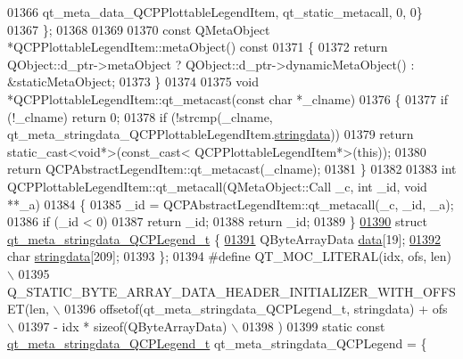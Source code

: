 \begin{DoxyCode}
01366       qt\_meta\_data\_QCPPlottableLegendItem,  qt\_static\_metacall, 0, 0\}
01367 \};
01368 
01369 
01370 \textcolor{keyword}{const} QMetaObject *QCPPlottableLegendItem::metaObject()\textcolor{keyword}{ const}
01371 \textcolor{keyword}{}\{
01372     \textcolor{keywordflow}{return} QObject::d\_ptr->metaObject ? QObject::d\_ptr->dynamicMetaObject() : &staticMetaObject;
01373 \}
01374 
01375 \textcolor{keywordtype}{void} *QCPPlottableLegendItem::qt\_metacast(\textcolor{keyword}{const} \textcolor{keywordtype}{char} *\_clname)
01376 \{
01377     \textcolor{keywordflow}{if} (!\_clname) \textcolor{keywordflow}{return} 0;
01378     \textcolor{keywordflow}{if} (!strcmp(\_clname, qt\_meta\_stringdata\_QCPPlottableLegendItem.\hyperlink{a00016_a25e998eb002b6a9f9e969afa5247748f}{stringdata}))
01379         \textcolor{keywordflow}{return} \textcolor{keyword}{static\_cast<}\textcolor{keywordtype}{void}*\textcolor{keyword}{>}(\textcolor{keyword}{const\_cast<} QCPPlottableLegendItem*\textcolor{keyword}{>}(\textcolor{keyword}{this}));
01380     \textcolor{keywordflow}{return} QCPAbstractLegendItem::qt\_metacast(\_clname);
01381 \}
01382 
01383 \textcolor{keywordtype}{int} QCPPlottableLegendItem::qt\_metacall(QMetaObject::Call \_c, \textcolor{keywordtype}{int} \_id, \textcolor{keywordtype}{void} **\_a)
01384 \{
01385     \_id = QCPAbstractLegendItem::qt\_metacall(\_c, \_id, \_a);
01386     \textcolor{keywordflow}{if} (\_id < 0)
01387         \textcolor{keywordflow}{return} \_id;
01388     \textcolor{keywordflow}{return} \_id;
01389 \}
\hypertarget{a00016_source_l01390}{}\hyperlink{a00016}{01390} \textcolor{keyword}{struct }\hyperlink{a00016_d2/da3/a00115}{qt\_meta\_stringdata\_QCPLegend\_t} \{
\hypertarget{a00016_source_l01391}{}\hyperlink{a00016_abb2a7af4ffa957bddb891b5663c0aa55}{01391}     QByteArrayData \hyperlink{a00016_abb2a7af4ffa957bddb891b5663c0aa55}{data}[19];
\hypertarget{a00016_source_l01392}{}\hyperlink{a00016_a26b79395b8d9f94641f81b197841ede1}{01392}     \textcolor{keywordtype}{char} \hyperlink{a00016_a26b79395b8d9f94641f81b197841ede1}{stringdata}[209];
01393 \};
01394 \textcolor{preprocessor}{#define QT\_MOC\_LITERAL(idx, ofs, len) \(\backslash\)}
01395 \textcolor{preprocessor}{    Q\_STATIC\_BYTE\_ARRAY\_DATA\_HEADER\_INITIALIZER\_WITH\_OFFSET(len, \(\backslash\)}
01396 \textcolor{preprocessor}{    offsetof(qt\_meta\_stringdata\_QCPLegend\_t, stringdata) + ofs \(\backslash\)}
01397 \textcolor{preprocessor}{        - idx * sizeof(QByteArrayData) \(\backslash\)}
01398 \textcolor{preprocessor}{    )}
01399 \textcolor{keyword}{static} \textcolor{keyword}{const} \hyperlink{a00016_d2/da3/a00115}{qt\_meta\_stringdata\_QCPLegend\_t} qt\_meta\_stringdata\_QCPLegend = \{

\end{DoxyCode}
